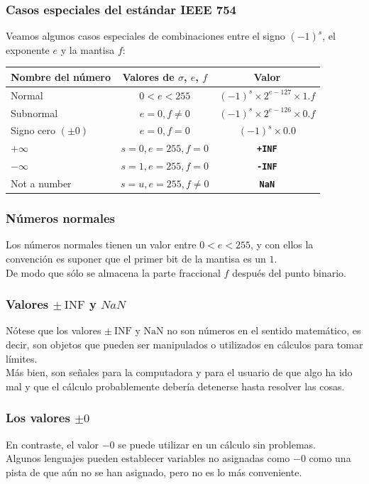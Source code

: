 \begin{frame}
\frametitle{Casos especiales del estándar IEEE 754}
Veamos algunos casos especiales de combinaciones entre el signo $(-1)^{s}$, el exponente $e$ y la mantisa $f$:
\pause
\begin{table}
\fontsize{10}{10}\selectfont
\begin{tabular}{l c c}
\hline
Nombre del número & Valores de $\sigma$, $e$, $f$ & Valor \\ \hline
Normal & $0 < e < 255$ & $(-1)^{s} \times 2^{e-127} \times 1.f$ \\ \hline
Subnormal & $e = 0, f \neq 0$ & $(-1)^{s} \times 2^{e-126} \times 0.f$ \\ \hline
Signo cero $(\pm 0)$ & $e = 0, f = 0$ & $(-1)^{s} \times 0.0$ \\ \hline
$+ \infty$ & $s = 0, e=255, f = 0$ & \textbf{\texttt{+INF}} \\ \hline
$- \infty$ & $s = 1, e=255, f = 0$ & \textbf{\texttt{-INF}} \\ \hline
Not a number & $s = u, e=255, f \neq 0$ & \textbf{\texttt{NaN}} \\ \hline
\end{tabular}
\end{table}
\end{frame}
\begin{frame}
\frametitle{Números normales}
Los números normales tienen un valor entre $0 < e < 255$, y con ellos la convención es suponer que el primer bit de la mantisa es un $1$.
\\
\bigskip
De modo que sólo se almacena la parte fraccional $f$ después del punto binario. 
\end{frame}
\begin{frame}
\frametitle{Valores $\pm \: \text{INF}$ y $NaN$ }
Nótese que los valores $\pm \: \text{INF}$ y $\text{NaN}$ no son números en el sentido matemático, es decir, son objetos que pueden ser manipulados o utilizados en cálculos para tomar límites.
\\
\bigskip
\pause
Más bien, son señales para la computadora y para el usuario de que algo ha ido mal y que el cálculo probablemente debería detenerse hasta resolver las cosas.
\end{frame}
\begin{frame}
\frametitle{Los valores $\pm 0$}
En contraste, el valor $-0$ se puede utilizar en un cálculo sin problemas.
\\
\bigskip
Algunos lenguajes pueden establecer variables no asignadas como $-0$ como una pista de que aún no se han asignado, pero no es lo más conveniente.
\end{frame}
